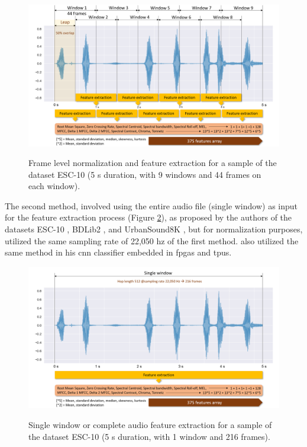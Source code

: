\begin{figure}[htbp]
    \raggedright
        \caption{Frame level normalization and feature extraction for a sample of the dataset ESC-10 (5 \gls{s} duration, with 9 windows and 44 frames on each window).}
        \includegraphics[width=1\textwidth]{resources/images/050-methods/Methods_feature_extraction_1_BDLib2.png}
        \label{fig:methods_feature_extraction_leap_window}
\end{figure}

The second method, involved using the entire audio file (single window) as input for the feature extraction process (Figure \ref{fig:methods_feature_extraction_single_window}), as proposed by the authors of the datasets ESC-10 \cite{PiczakESC2015}, BDLib2 \cite{Bountourakis2015}, and UrbanSound8K \cite{Salamon2017}, but for normalization purposes, utilized the same sampling rate of 22,050 \gls{hz} of the first method. \Textcite{Vandendriessche2021} also utilized the same method in his \gls{cnn} classifier embedded in \gls{fpga}s and \gls{tpu}s.


\begin{figure}[htbp]
    \raggedright
        \caption{Single window or complete audio feature extraction for a sample of the dataset ESC-10 (5 \gls{s} duration, with 1 window and 216 frames).}
        \includegraphics[width=1\textwidth]{resources/images/050-methods/Methods_feature_extraction_2_BDLib2.png}
        \label{fig:methods_feature_extraction_single_window}
\end{figure}

